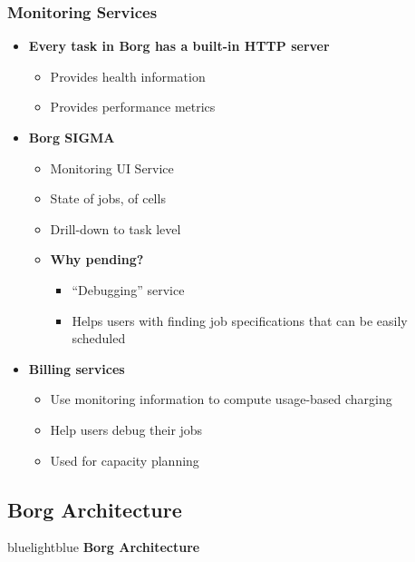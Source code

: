 \begin{frame}
\frametitle{Monitoring Services}
\begin{itemize}
	\item {\bf Every task in Borg has a built-in HTTP server}
	\begin{itemize}
		\item Provides health information
		\item Provides performance metrics
	\end{itemize}
	\item {\bf Borg SIGMA}
	\begin{itemize}
		\item Monitoring UI Service
		\item State of jobs, of cells
		\item Drill-down to task level
		\item {\bf Why pending?}
		\begin{itemize}
			\item ``Debugging'' service
			\item Helps users with finding job specifications that can be easily scheduled
		\end{itemize}
	\end{itemize}
	\item {\bf Billing services}
	\begin{itemize}
		\item Use monitoring information to compute usage-based charging
		\item Help users debug their jobs
		\item Used for capacity planning
	\end{itemize}
\end{itemize}
\end{frame}

\subsection{Borg Architecture}
\begin{frame}
 \begin{colorblock}{blue}{lightblue}{ }
    \Large \textbf{Borg Architecture}
  \end{colorblock}
\end{frame}

